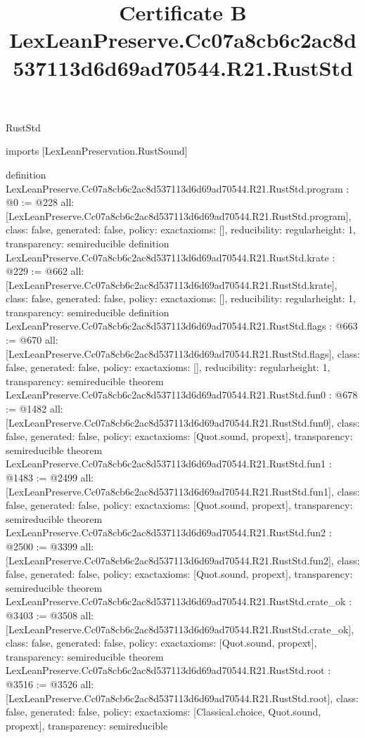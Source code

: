 \begin{lexlean}{RustStd}
\title{Certificate B LexLeanPreserve.Cc07a8cb6c2ac8d537113d6d69ad70544.R21.RustStd}
\begin{coremodule}
imports [LexLeanPreservation.RustSound]

definition LexLeanPreserve.Cc07a8cb6c2ac8d537113d6d69ad70544.R21.RustStd.program : @0 := @228 {
  all: [LexLeanPreserve.Cc07a8cb6c2ac8d537113d6d69ad70544.R21.RustStd.program],
  class: false,
  generated: false,
  policy: exact{axioms: []},
  reducibility: regular{height: 1},
  transparency: semireducible
}
definition LexLeanPreserve.Cc07a8cb6c2ac8d537113d6d69ad70544.R21.RustStd.krate : @229 := @662 {
  all: [LexLeanPreserve.Cc07a8cb6c2ac8d537113d6d69ad70544.R21.RustStd.krate],
  class: false,
  generated: false,
  policy: exact{axioms: []},
  reducibility: regular{height: 1},
  transparency: semireducible
}
definition LexLeanPreserve.Cc07a8cb6c2ac8d537113d6d69ad70544.R21.RustStd.flags : @663 := @670 {
  all: [LexLeanPreserve.Cc07a8cb6c2ac8d537113d6d69ad70544.R21.RustStd.flags],
  class: false,
  generated: false,
  policy: exact{axioms: []},
  reducibility: regular{height: 1},
  transparency: semireducible
}
theorem LexLeanPreserve.Cc07a8cb6c2ac8d537113d6d69ad70544.R21.RustStd.fun0 : @678 := @1482 {
  all: [LexLeanPreserve.Cc07a8cb6c2ac8d537113d6d69ad70544.R21.RustStd.fun0],
  class: false,
  generated: false,
  policy: exact{axioms: [Quot.sound, propext]},
  transparency: semireducible
}
theorem LexLeanPreserve.Cc07a8cb6c2ac8d537113d6d69ad70544.R21.RustStd.fun1 : @1483 := @2499 {
  all: [LexLeanPreserve.Cc07a8cb6c2ac8d537113d6d69ad70544.R21.RustStd.fun1],
  class: false,
  generated: false,
  policy: exact{axioms: [Quot.sound, propext]},
  transparency: semireducible
}
theorem LexLeanPreserve.Cc07a8cb6c2ac8d537113d6d69ad70544.R21.RustStd.fun2 : @2500 := @3399 {
  all: [LexLeanPreserve.Cc07a8cb6c2ac8d537113d6d69ad70544.R21.RustStd.fun2],
  class: false,
  generated: false,
  policy: exact{axioms: [Quot.sound, propext]},
  transparency: semireducible
}
theorem LexLeanPreserve.Cc07a8cb6c2ac8d537113d6d69ad70544.R21.RustStd.crate_ok : @3403 := @3508 {
  all: [LexLeanPreserve.Cc07a8cb6c2ac8d537113d6d69ad70544.R21.RustStd.crate_ok],
  class: false,
  generated: false,
  policy: exact{axioms: [Quot.sound, propext]},
  transparency: semireducible
}
theorem LexLeanPreserve.Cc07a8cb6c2ac8d537113d6d69ad70544.R21.RustStd.root : @3516 := @3526 {
  all: [LexLeanPreserve.Cc07a8cb6c2ac8d537113d6d69ad70544.R21.RustStd.root],
  class: false,
  generated: false,
  policy: exact{axioms: [Classical.choice, Quot.sound, propext]},
  transparency: semireducible
}


\end{coremodule}
\end{lexlean}

